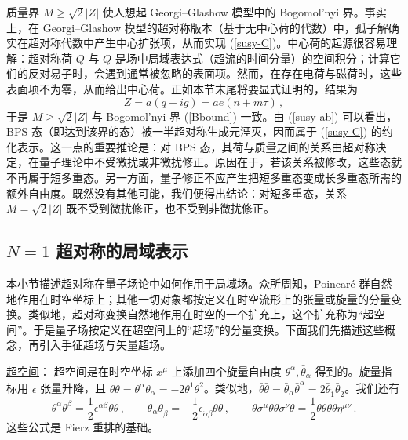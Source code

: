 质量界 $M\geq {\sqrt 2}|Z|$ 使人想起 Georgi–Glashow 模型中的 Bogomol'nyi 界。事实上，在 Georgi–Glashow 模型的超对称版本（基于无中心荷的代数）中，孤子解确实在超对称代数中产生中心扩张项，从而实现 (\ref{susy-C})\cite{Olive-Witten}。中心荷的起源很容易理解：超对称荷 $Q$ 与 $\bar Q$ 是场中局域表达式（超流的时间分量）的空间积分；计算它们的反对易子时，会遇到通常被忽略的表面项。然而，在存在电荷与磁荷时，这些表面项不为零，从而给出中心荷。正如本节末尾将要显式证明的，结果为
\begin{equation}
Z = a (q+ig)= ae (n+m\tau)\,,
\label{Ztau}
\end{equation}
于是 $M\geq {\sqrt 2}|Z|$ 与 Bogomol'nyi 界 (\ref{Bbound}) 一致。由 (\ref{susy-ab}) 可以看出，BPS 态（即达到该界的态）被一半超对称生成元湮灭，因而属于
(\ref{susy-C}) 的约化表示。这一点的重要推论是：对 BPS 态，其荷与质量之间的关系由超对称决定，在量子理论中不受微扰或非微扰修正。原因在于，若该关系被修改，这些态就不再属于短多重态。另一方面，量子修正不应产生把短多重态变成长多重态所需的额外自由度。既然没有其他可能，我们便得出结论：对短多重态，关系 $M={\sqrt 2}|Z|$ 既不受到微扰修正，也不受到非微扰修正。


\subsection{$N=1$ 超对称的局域表示}

本小节描述超对称在量子场论中如何作用于局域场。众所周知，Poincaré 群自然地作用在时空坐标上；其他一切对象都按定义在时空流形上的张量或旋量的分量变换。类似地，超对称变换自然地作用在时空的一个扩充上，这个扩充称为“超空间”。于是量子场按定义在超空间上的“超场”的分量变换。下面我们先描述这些概念，再引入手征超场与矢量超场。

\noindent\underline{超空间}：
\noindent 超空间是在时空坐标 $x^\mu$ 上添加四个旋量自由度 $\theta^\alpha,\bar\theta_{\dot\alpha}$ 得到的。旋量指标用 $\epsilon$ 张量升降，且 $\theta\theta = \theta^\alpha\theta_\alpha = -2
\theta^1\theta^2$。类似地，$\bar\theta\bar\theta=
\bar\theta_{\dot\alpha}\bar\theta^{\dot\alpha}= 2\bar\theta_{\dot 1} 
\bar\theta_{\dot 2}$。我们还有
$$
\theta^{\alpha}\theta^{\beta}=\frac{1}{2} \epsilon^{\alpha \beta}
\theta \theta\,,\qquad
\bar{\theta}_{\dot{\alpha}}\bar{\theta}_{\dot{\beta}}=-\frac{1}{2}
\epsilon_{\dot{\alpha}\dot{\beta}} \bar{\theta}\bar{\theta}\,,\qquad
\theta \sigma^\mu \bar{\theta} \theta \sigma^\nu \bar{\theta}=
\frac{1}{2}\theta \theta \bar{\theta}\bar{\theta} \eta^{\mu\nu}\,.
$$
这些公式是 Fierz 重排的基础。

